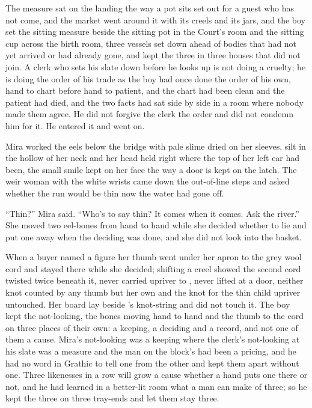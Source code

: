 The measure sat on the landing the way a pot sits set out for a guest who has not come, and the market went around it with its creels and its jars, and the boy set the sitting measure beside the sitting pot in the Court's room and the sitting cup across the birth room, three vessels set down ahead of bodies that had not yet arrived or had already gone, and kept the three in three houses that did not join. A clerk who sets his slate down before he looks up is not doing a cruelty; he is doing the order of his trade as the boy had once done the order of his own, hand to chart before hand to patient, and the chart had been clean and the patient had died, and the two facts had sat side by side in a room where nobody made them agree. He did not forgive the clerk the order and did not condemn him for it. He entered it and went on.

\scenebreak

Mira worked the eels below the bridge with pale slime dried on her sleeves, silt in the hollow of her neck and her head held right where the top of her left ear had been, the small smile kept on her face the way a door is kept on the latch. The weir woman with the white wrists came down the out-of-line steps and asked whether the run would be thin now the water had gone off.

“Thin?” Mira said. “Who's to say thin? It comes when it comes. Ask the river.” She moved two eel-bones from hand to hand while she decided whether to lie and put one away when the deciding was done, and she did not look into the basket.

When a buyer named a figure her thumb went under her apron to the grey wool cord and stayed there while she decided; shifting a creel showed the second cord twisted twice beneath it, never carried upriver to , never lifted at a door, neither knot counted by any thumb but her own and the knot for the thin child upriver untouched. Her board lay beside 's knot-string and did not touch it. The boy kept the not-looking, the bones moving hand to hand and the thumb to the cord on three places of their own: a keeping, a deciding and a record, and not one of them a cause. Mira's not-looking was a keeping where the clerk's not-looking at his slate was a measure and the man on the block's had been a pricing, and he had no word in Grathic to tell one from the other and kept them apart without one. Three likenesses in a row will grow a cause whether a hand puts one there or not, and he had learned in a better-lit room what a man can make of three; so he kept the three on three tray-ends and let them stay three.

